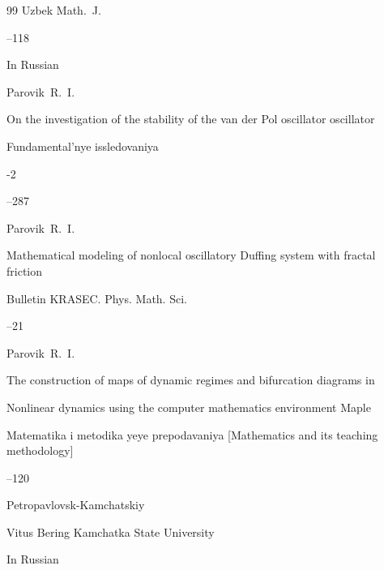 \begin{thebibliography}{99}
\jour Uzbek Math.~J.



--118




\lang In Russian

\by Parovik~R.~I.

\paper On the investigation of the stability of the van der Pol oscillator oscillator

\jour Fundamental'nye issledovaniya


-2

--287




\by Parovik~R.~I. 

\paper Mathematical modeling of nonlocal oscillatory Duffing system with fractal friction

\jour Bulletin KRASEC. Phys. Math. Sci.




–21





\by Parovik~R.~I.

\paper The construction of maps of dynamic regimes and bifurcation diagrams in

Nonlinear dynamics using the computer mathematics environment Maple

\inbook Matematika i metodika yeye prepodavaniya \rm [Mathematics and its teaching methodology]


--120

\publaddr Petropavlovsk-Kamchatskiy

\publ Vitus Bering Kamchatka State University

\lang In Russian





\end{thebibliography}



%

%

